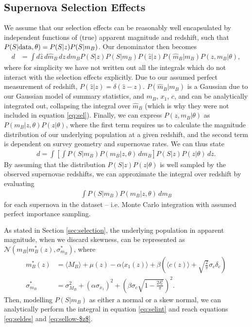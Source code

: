 \documentclass[a4paper,fleqn,usenatbib]{mnras}
\begin{document}
\subsection{Supernova Selection Effects}

We assume that our selection effects can be reasonably well encapsulated by independent functions of (true) apparent magnitude and redshift, such that $P(S|{\rm data}, \theta) = P(S|z) P(S|m_B)$. Our denominator then becomes
\begin{align}
d &= \int d\hat{z} \, d\hat{m}_B \, dz \, dm_B P(S|z) P(S|m_B) P(\hat{z}|z) P(\hat{m}_B|m_B) P(z, m_B | \theta), \label{eq:sel}
\end{align}
where for simplicity we have not written out all the integrals which do not interact with the selection effects explicitly. Due to our assumed perfect measurement of redshift, $P(\hat{z}|z) = \delta(\hat{z} - z)$. $P(\hat{m}_B | m_B)$ is a Gaussian due to our Gaussian model of summary statistics, and $m_B$, $x_1$, $c$, and can be analytically integrated out, collapsing the integral over $\hat{m}_B$ (which is why they were not included in equation \eqref{eq:sel}). Finally, we can express $P(z, m_B | \theta)$ as  $P(m_B | z, \theta) P(z | \theta)$, where the first term requires us to calculate the magnitude distribution of our underlying population at a given redshift, and the second term is dependent on survey geometry and supernovae rates. We can thus state
\begin{align}
d = \int \left[ \int P(S|m_B) P(m_B | z, \theta)\, dm_B \right] P(S|z)P(z|\theta)\, dz.
\end{align}
By assuming that the distribution $P(S|z)P(z|\theta)$ is well sampled by the observed supernovae redshifts, we can approximate the integral over redshift by evaluating
\begin{align}
\int P(S|m_B) P(m_B | z, \theta)\, dm_B \label{eq:selint}
\end{align}
for each supernova in the dataset -- i.e. Monte Carlo integration with assumed perfect importance sampling.

As stated in Section \ref{sec:selection}, the underlying population in apparent magnitude, when we discard skewness, can be represented as $\mathcal{N}(m_B|m_B^*(z), \sigma^*_{m_B})$, where
\begin{align}
m_B^*(z) &= \langle M_B \rangle + \mu(z) - \alpha \langle x_1(z) \rangle + \beta \left(\langle c(z) \rangle + \sqrt{\frac{2}{\pi}}\sigma_c \delta_c\right)\label{eq:disc1} \\
\sigma^*_{m_B} &= \sigma_{M_B}^2 + (\alpha \sigma_{x_1})^2 +  \left(\beta \sigma_c \sqrt{1 - \frac{2\delta_c^2}{\pi}}\right)^2. \label{eq:disc2}
\end{align}
Then, modelling $P(S|m_B)$ as either a normal or a skew normal, we can analytically perform the integral in equation \eqref{eq:selint} and reach equations \eqref{eq:seldes} and \eqref{eq:sellow-$z$}.
\end{document}
